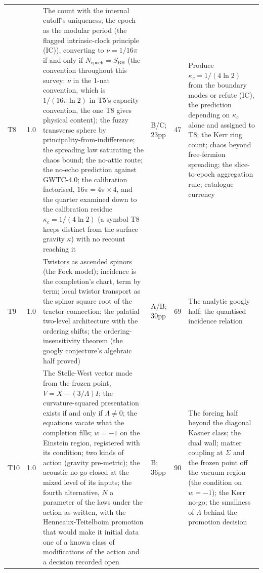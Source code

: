 \documentclass[11pt]{article}
\theoremstyle{definition}
\begin{document}
\begin{longtable}{p{} p{} p{} p{} p{} p{}}
T8 & 1.0 & The count with the internal cutoff's uniqueness; the epoch as the modular period (the flagged intrinsic-clock principle (IC)), converting to $\nu = 1/16\pi$ if and only if $N_{\mathrm{epoch}} = S_{\mathrm{BH}}$ (the convention throughout this survey: $\nu$ in the 1-nat convention, which is $1/(16\pi\ln 2)$ in T5's capacity convention, the one T8 gives physical content); the fuzzy transverse sphere by principality-from-indifference; the spreading law saturating the chaos bound; the no-attic route; the no-echo prediction against GWTC-4.0; the calibration factorised, $16\pi = 4\pi \times 4$, and the quarter examined down to the calibration residue $\kappa_{c} = 1/(4\ln 2)$ (a symbol T8 keeps distinct from the surface gravity $\kappa$) with no recount reaching it \cite{ButlerT8} & B/C; 23pp & 47 & Produce $\kappa_{c} = 1/(4\ln 2)$ from the boundary modes or refute (IC), the prediction depending on $\kappa_{c}$ alone and assigned to T8; the Kerr ring count; chaos beyond free-fermion spreading; the slice-to-epoch aggregation rule; catalogue currency \\
T9 & 1.0 & Twistors as ascended spinors (the Fock model); incidence is the completion's chart, term by term; local twistor transport as the spinor square root of the tractor connection; the palatial two-level architecture with the ordering shifts; the ordering-insensitivity theorem (the googly conjecture's algebraic half proved) \cite{ButlerT9} & A/B; 30pp & 69 & The analytic googly half; the quantised incidence relation \\
T10 & 1.0 & The Stelle-West vector made from the frozen point, $V = X - (3/\Lambda)I$; the curvature-squared presentation exists if and only if $\Lambda \neq 0$; the equations vacate what the completion fills; $w = -1$ on the Einstein region, registered with its condition; two kinds of action (gravity pre-metric); the acoustic no-go closed at the mixed level of its inputs; the fourth alternative, $N$ a parameter of the laws under the action as written, with the Henneaux-Teitelboim promotion that would make it initial data one of a known class of modifications of the action and a decision recorded open \cite{ButlerT10} & B; 36pp & 90 & The forcing half beyond the diagonal Kasner class; the dual wall; matter coupling at $\Sigma$ and the frozen point off the vacuum region (the condition on $w = -1$); the Kerr no-go; the smallness of $\Lambda$ behind the promotion decision \\

\end{longtable}
\end{document}
